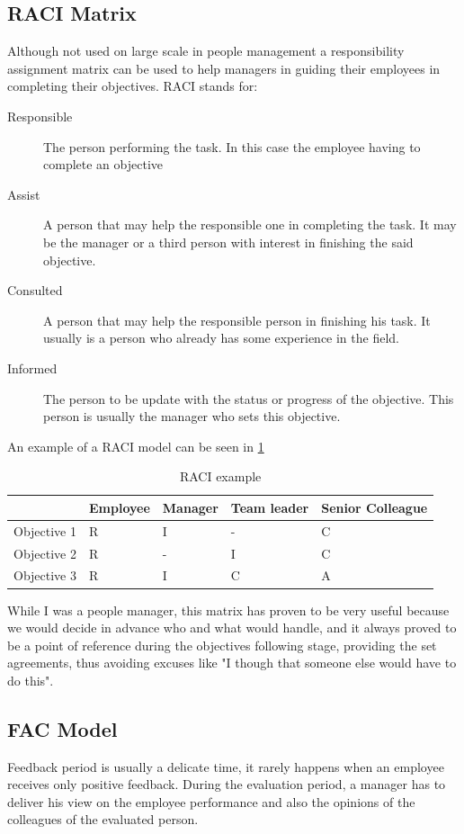 \subsection{RACI Matrix}
\label{subsec:raci}
Although not used on large scale in people management a responsibility assignment matrix can be used to help managers in guiding their employees in completing their objectives.
RACI stands for:
\begin{description}
\item[Responsible] The person performing the task. In this case the employee having to complete an objective
\item[Assist] A person that may help the responsible one in completing the task. It may be the manager or a third person with interest in finishing the said objective.
\item[Consulted] A person that may help the responsible person in finishing his task. It usually is a person who already has some experience in the field.
\item[Informed] The person to be update with the status or progress of the objective. This person is usually the manager who sets this objective.
\end{description}
An example of a RACI model can be seen in \cref{table:raciex}
\begin{table}[h]
  \centering
  \caption{RACI example}
  \setlength\tabcolsep{3.8pt}
  \setlength\extrarowheight{1pt}
    \begin{tabular}{ llllp{3cm}}
    \toprule
    & Employee & Manager & Team leader & Senior Colleague \\ \midrule
    Objective 1 & R & I & - & C \\ \midrule
    Objective 2 & R & - & I & C \\ \midrule
    Objective 3 & R & I & C & A \\ \bottomrule
    \end{tabular}
    \label{table:raciex}
\end{table}

While I was a people manager, this matrix has proven to be very useful because we would decide in advance who and what would handle, and it always proved to be a point of reference during the objectives following stage, providing the set agreements, thus avoiding excuses like "I though that someone else would have to do this".
\subsection{FAC Model}
\label{subsec:fac}
Feedback period is usually a delicate time, it rarely happens when an employee receives only positive feedback. During the evaluation period, a manager has to deliver his view on the employee performance and also the opinions of the colleagues of the evaluated person. 

